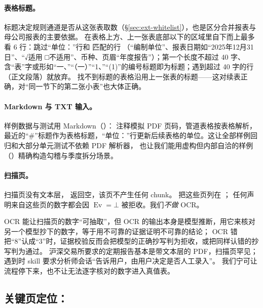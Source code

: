 \paragraph{表格标题。}
标题决定规则通道是否从这张表取数（\S\ref{sec:ext-whitelist}），也是区分合并报表与母公司报表的主要依据。
 在表格上方、上一张表底部以下的区域里自下而上最多看 6 行：跳过“单位：”行和  匹配的行
（“编制单位”、报表日期如“2025年12月31日”、“√适用 □不适用”、币种、页眉“年度报告”）；第一个长度不超过 40 字、
含“表”字或形如“一、”“（一）”“1、”“(1)”的编号标题即为标题；遇到超过 40 字的行（正文段落）就放弃。
找不到标题的表格沿用上一张表的标题——这对续表正确，对“同一节下的第二张小表”也大体正确。

\paragraph{Markdown 与 TXT 输入。}
样例数据与测试用 Markdown（）： 注释模拟 PDF 页码，管道表格按表格解析，
最近的“\#”标题作为表格标题，“单位：”行更新后续表格的单位。这让全部样例回归和大部分单元测试不依赖 PDF 解析器，
也让我们能用虚构但内部自洽的样例（）精确构造勾稽与季度拆分场景。

\paragraph{扫描页。}
扫描页没有文本层， 返回空，该页不产生任何 chunk。 把这些页列在 ；
任何声明来自这些页的数字都会因 $\operatorname{Ev}=\bot$ 被拒收。我们\emph{不做} OCR。

\begin{tradeoff}
OCR 能让扫描页的数字“可抽取”，但 OCR 的输出本身是模型推断，用它来核对另一个模型抄下的数字，等于用不可靠的证据证明不可靠的结论；
OCR 错把“8”认成“3”时，证据校验反而会把模型的正确抄写判为拒收，或把同样认错的抄写判为通过。
沪深交易所要求的定期报告基本是带文本层的 PDF，扫描页罕见；遇到时 skill 要求分析师会话“告诉用户，由用户决定是否人工录入”。
我们宁可让流程停下来，也不让无法逐字核对的数字进入真值表。
\end{tradeoff}

\subsection{关键页定位：}
\label{sec:ext-locate}

